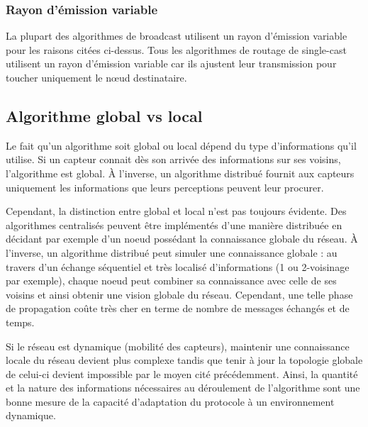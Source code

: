 \subsubsection{Rayon d'émission variable}
La plupart des algorithmes  de broadcast utilisent un rayon d'émission variable pour les raisons citées ci-dessus. Tous les algorithmes de routage de single-cast utilisent un rayon d'émission variable car ils ajustent leur transmission pour toucher uniquement le nœud destinataire.



\subsection{Algorithme global vs local}
Le fait qu'un algorithme soit global ou local dépend du type d'informations qu'il utilise. Si un capteur connait dès son arrivée des informations sur ses voisins, l'algorithme est global. À l'inverse, un algorithme distribué fournit aux capteurs uniquement les informations que leurs perceptions peuvent leur procurer.

Cependant, la distinction entre global et local n'est pas toujours évidente. Des algorithmes centralisés peuvent être implémentés d'une manière distribuée en décidant par exemple d'un noeud possédant la connaissance globale du réseau. À l'inverse, un algorithme distribué peut simuler une connaissance globale : au travers d'un échange séquentiel et très localisé d'informations  (1 ou 2-voisinage par exemple), chaque noeud peut combiner sa connaissance avec celle de ses voisins et ainsi obtenir une vision globale du réseau. Cependant, une telle phase de propagation coûte très cher en terme de nombre de messages échangés et de temps.

Si le réseau est dynamique (mobilité des capteurs), maintenir une connaissance locale du réseau devient plus complexe tandis que tenir à jour la topologie globale de celui-ci devient impossible par le moyen cité précédemment. Ainsi, la quantité et la nature des informations nécessaires au déroulement de l'algorithme sont une bonne mesure de la capacité d'adaptation du protocole à un environnement dynamique.   

